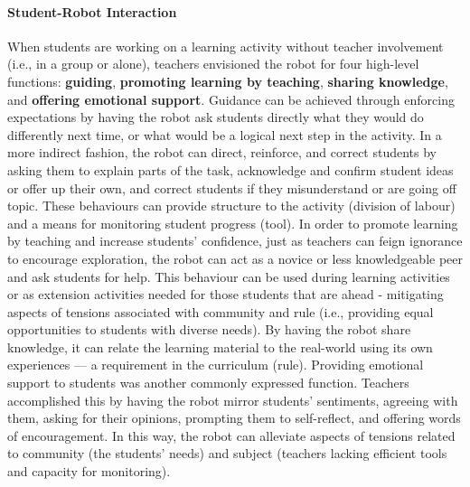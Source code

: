 \paragraph{Student-Robot Interaction} When students are working on a learning activity without teacher involvement (i.e., in a group or alone), teachers envisioned the robot for four high-level functions: \textbf{guiding}, \textbf{promoting learning by teaching}, \textbf{sharing knowledge}, and \textbf{offering emotional support}. Guidance can be achieved through enforcing expectations by having the robot ask students directly what they would do differently next time, or what would be a logical next step in the activity.  In a more indirect fashion, the robot can direct, reinforce, and correct students by asking them to explain parts of the task, acknowledge and confirm student ideas or offer up their own, and correct students if they misunderstand or are going off topic. These behaviours can provide structure to the activity (division of labour) and a means for monitoring student progress (tool).
In order to promote learning by teaching and increase students' confidence, just as teachers can feign ignorance to encourage exploration, the robot can act as a novice or less knowledgeable peer and ask students for help. This behaviour can be used during learning activities or as extension activities needed for those students that are ahead - mitigating aspects of tensions associated with community and rule (i.e., providing equal opportunities to students with diverse needs). By having the robot share knowledge, it can relate the learning material to the real-world using its own experiences --- a requirement in the curriculum (rule). 
Providing emotional support to students was another commonly expressed function. Teachers accomplished this by having the robot mirror students' sentiments, agreeing with them, asking for their opinions, prompting them to self-reflect, and offering words of encouragement. In this way, the robot can alleviate aspects of tensions related to community (the students' needs) and subject (teachers lacking efficient tools and capacity for monitoring).\\

